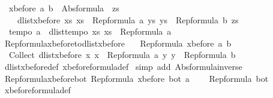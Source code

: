 \begin{isabellebody}
\isanewline
\ \ {\isachardoublequoteopen}xbefore\ a\ b\ {\isacharequal}\ Abs{\isacharunderscore}formula\ {\isacharbraceleft}\ zs\ {\isachardot}\ \isanewline
\ \ \ \ dlist{\isacharunderscore}xbefore\ {\isacharparenleft}{\isasymlambda}xs{\isachardot}\ xs\ {\isasymin}\ Rep{\isacharunderscore}formula\ a{\isacharparenright}\ {\isacharparenleft}{\isasymlambda}ys{\isachardot}\ ys\ {\isasymin}\ Rep{\isacharunderscore}formula\ b{\isacharparenright}\ zs\ {\isacharbraceright}{\isachardoublequoteclose}\isanewline
\isanewline
{}\isamarkupfalse%
\ \isanewline
\ \ {\isachardoublequoteopen}tempo{}\ a\ {\isacharequal}\ dlist{\isacharunderscore}tempo{}\ {\isacharparenleft}{\isasymlambda}xs{\isachardot}\ xs\ {\isasymin}\ Rep{\isacharunderscore}formula\ a{\isacharparenright}{\isachardoublequoteclose}\isanewline
\ \ \ \ \isanewline
{}\isamarkupfalse%
\ Rep{\isacharunderscore}formula{\isacharunderscore}xbefore{\isacharunderscore}to{\isacharunderscore}dlist{\isacharunderscore}xbefore{\isacharcolon}\ \isanewline
\ \ {\isachardoublequoteopen}Rep{\isacharunderscore}formula\ {\isacharparenleft}xbefore\ a\ b{\isacharparenright}\ {\isacharequal}\ \isanewline
\ \ Collect\ {\isacharparenleft}dlist{\isacharunderscore}xbefore\ {\isacharparenleft}{\isasymlambda}x{\isachardot}\ x\ {\isasymin}\ Rep{\isacharunderscore}formula\ a{\isacharparenright}\ {\isacharparenleft}{\isasymlambda}y{\isachardot}\ y\ {\isasymin}\ Rep{\isacharunderscore}formula\ b{\isacharparenright}{\isacharparenright}{\isachardoublequoteclose}\isanewline
%
\isadelimproof
%
\endisadelimproof
%
\isatagproof
{}\isamarkupfalse%
\ dlist{\isacharunderscore}xbefore{\isacharunderscore}def\ xbefore{\isacharunderscore}formula{\isacharunderscore}def\isanewline
{}\isamarkupfalse%
\ {\isacharparenleft}simp\ add{\isacharcolon}\ Abs{\isacharunderscore}formula{\isacharunderscore}inverse{\isacharparenright}%
\endisatagproof
{\isafoldproof}%
%
\isadelimproof
\isanewline
%
\endisadelimproof
\isanewline
{}\isamarkupfalse%
\ Rep{\isacharunderscore}formula{\isacharunderscore}xbefore{\isacharunderscore}bot{\isacharunderscore}{}{\isacharcolon}\ {\isachardoublequoteopen}Rep{\isacharunderscore}formula\ {\isacharparenleft}xbefore\ bot\ a{\isacharparenright}\ {\isacharequal}\ \isanewline
\ \ Rep{\isacharunderscore}formula\ bot{\isachardoublequoteclose}\isanewline
%
\isadelimproof
%
\endisadelimproof
%
\isatagproof
{}\isamarkupfalse%
\ xbefore{\isacharunderscore}formula{\isacharunderscore}def\ \isanewline
{}\isamarkupfalse%

\end{isabellebody}
